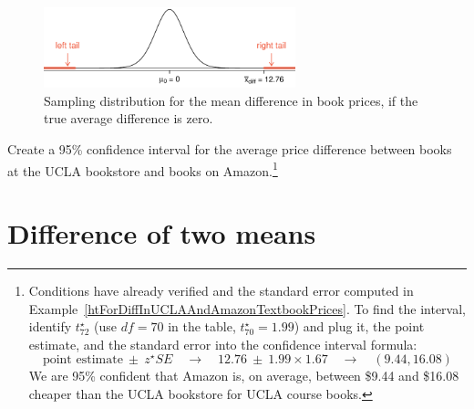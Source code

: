 \begin{figure}[h]
\centering
\includegraphics[width=0.65\textwidth]{ch_inference_for_means/figures/textbooksS10/textbooksS10HTTails}
\caption{Sampling distribution for the mean difference in book prices, if the true average difference is zero.}
\label{textbooksS10HTTails}
\end{figure}

\begin{exercise}
Create a 95\% confidence interval for the average price difference between books at the UCLA bookstore and books on Amazon.\footnote{Conditions have already verified and the standard error computed in Example~\ref{htForDiffInUCLAAndAmazonTextbookPrices}. To find the interval, identify $t^{\star}_{72}$ (use $df=70$ in the table, $t^{\star}_{70} = 1.99$) and plug it, the point estimate, and the standard error into the confidence interval formula:
$$\text{point estimate} \ \pm\ z^{\star}SE \quad\to\quad 12.76 \ \pm\ 1.99\times 1.67 \quad\to\quad (9.44, 16.08)$$
We are 95\% confident that Amazon is, on average, between \$9.44 and \$16.08 cheaper than the UCLA bookstore for UCLA course books.}


\end{exercise}



\section[Difference of two means]{Difference of two means ~}
\label{differenceOfTwoMeans}


